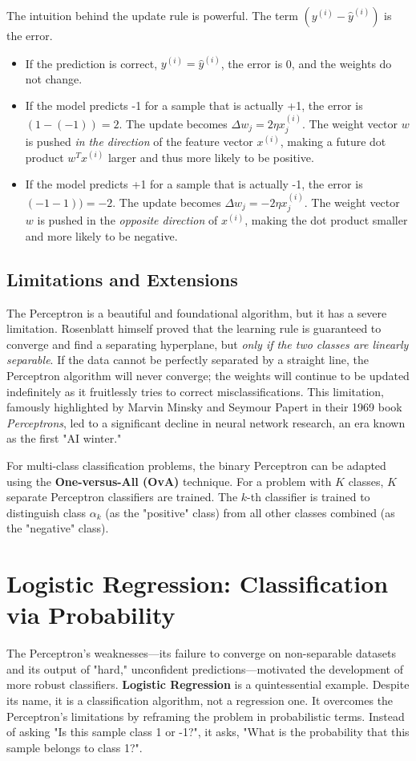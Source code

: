 The intuition behind the update rule is powerful. The term $(y^{(i)} - \hat{y}^{(i)})$ is the error.
\begin{itemize}
    \item If the prediction is correct, $y^{(i)} = \hat{y}^{(i)}$, the error is 0, and the weights do not change.
    \item If the model predicts -1 for a sample that is actually +1, the error is $(1 - (-1)) = 2$. The update becomes $\Delta w_j = 2\eta x_j^{(i)}$. The weight vector $w$ is pushed \textit{in the direction} of the feature vector $x^{(i)}$, making a future dot product $w^T x^{(i)}$ larger and thus more likely to be positive.
    \item If the model predicts +1 for a sample that is actually -1, the error is $(-1 - 1)) = -2$. The update becomes $\Delta w_j = -2\eta x_j^{(i)}$. The weight vector $w$ is pushed in the \textit{opposite direction} of $x^{(i)}$, making the dot product smaller and more likely to be negative.
\end{itemize}

\subsection*{Limitations and Extensions}
The Perceptron is a beautiful and foundational algorithm, but it has a severe limitation. Rosenblatt himself proved that the learning rule is guaranteed to converge and find a separating hyperplane, but \textit{only if the two classes are linearly separable}. If the data cannot be perfectly separated by a straight line, the Perceptron algorithm will never converge; the weights will continue to be updated indefinitely as it fruitlessly tries to correct misclassifications. This limitation, famously highlighted by Marvin Minsky and Seymour Papert in their 1969 book \textit{Perceptrons}, led to a significant decline in neural network research, an era known as the first "AI winter."

For multi-class classification problems, the binary Perceptron can be adapted using the \textbf{One-versus-All (OvA)} technique. For a problem with $K$ classes, $K$ separate Perceptron classifiers are trained. The $k$-th classifier is trained to distinguish class $\alpha_k$ (as the "positive" class) from all other classes combined (as the "negative" class).

\section{Logistic Regression: Classification via Probability}
\label{sec:logistic_regression}
The Perceptron's weaknesses—its failure to converge on non-separable datasets and its output of "hard," unconfident predictions—motivated the development of more robust classifiers. \textbf{Logistic Regression} is a quintessential example. Despite its name, it is a classification algorithm, not a regression one. It overcomes the Perceptron's limitations by reframing the problem in probabilistic terms. Instead of asking "Is this sample class 1 or -1?", it asks, "What is the probability that this sample belongs to class 1?".

